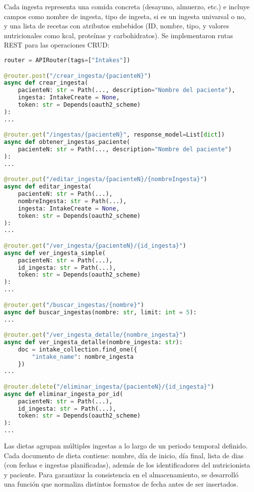 Cada ingesta representa una comida concreta (desayuno, almuerzo, etc.) e incluye campos como nombre de ingesta, tipo de ingesta, si es un ingesta univarsal o no, y una lista de recetas con atributos embebidos (ID, nombre, tipo, y valores nutricionales como kcal, proteínas y carbohidratos). Se implementaron rutas REST para las operaciones CRUD:

\begin{lstlisting}[language=Python, caption={Implementación de las rutas REST de ingestas}]
router = APIRouter(tags=["Intakes"])

@router.post("/crear_ingesta/{pacienteN}")
async def crear_ingesta(
    pacienteN: str = Path(..., description="Nombre del paciente"),
    ingesta: IntakeCreate = None,
    token: str = Depends(oauth2_scheme)
):
...

@router.get("/ingestas/{pacienteN}", response_model=List[dict])
async def obtener_ingestas_paciente(
    pacienteN: str = Path(..., description="Nombre del paciente")
):
...

@router.put("/editar_ingesta/{pacienteN}/{nombreIngesta}")
async def editar_ingesta(
    pacienteN: str = Path(...),
    nombreIngesta: str = Path(...),
    ingesta: IntakeCreate = None,
    token: str = Depends(oauth2_scheme)
):    
...

@router.get("/ver_ingesta/{pacienteN}/{id_ingesta}")
async def ver_ingesta_simple(
    pacienteN: str = Path(...),
    id_ingesta: str = Path(...),
    token: str = Depends(oauth2_scheme)
):
...

@router.get("/buscar_ingestas/{nombre}")
async def buscar_ingestas(nombre: str, limit: int = 5):
...

@router.get("/ver_ingesta_detalle/{nombre_ingesta}")
async def ver_ingesta_detalle(nombre_ingesta: str):
    doc = intake_collection.find_one({
        "intake_name": nombre_ingesta
    })
...

@router.delete("/eliminar_ingesta/{pacienteN}/{id_ingesta}")
async def eliminar_ingesta_por_id(
    pacienteN: str = Path(...),
    id_ingesta: str = Path(...),
    token: str = Depends(oauth2_scheme)
):
...
\end{lstlisting}

Las dietas agrupan múltiples ingestas a lo largo de un periodo temporal definido. Cada documento de dieta contiene: nombre, día de inicio, día final, lista de dias (con fechas e ingestas planificadas), además de los identificadores del nutricionista y paciente. Para garantizar la consistencia en el almacenamiento, se desarrolló una función que normaliza distintos formatos de fecha antes de ser insertados. 

